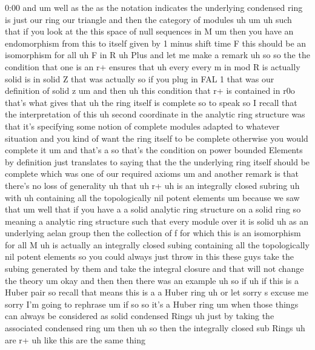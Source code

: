 \begin{unfinished}{0:00}
and  um  well  as  the  as  the  notation
indicates  the  underlying  condensed  ring
is  just  our  ring  our  triangle  and  then
the  category  of
modules
uh
um  uh  such  that  if  you  look  at  the  this
space  of  null  sequences  in  M  um  then  you
have  an  endomorphism  from  this  to  itself
given  by  1  minus  shift  time  F  this
should  be  an  isomorphism  for  all  uh  F  in
R  uh
Plus
and  let  me  make  a  remark  uh
so  so  the  the  condition  that  one  is  an
r+  ensures
that  uh  every  every  m  in  mod  R  is
actually  solid  is  in  solid
Z  that  was  actually  so  if  you  plug  in
FAL  1  that  was  our  definition  of  solid  z
um  and  then  uh  this  condition  that  r+  is
contained  in  r0o  that's  what  gives  that
uh  the  ring  itself  is  complete  so  to
speak  so  I  recall  that  the
interpretation  of  this  uh  second
coordinate  in  the  analytic  ring
structure  was  that  it's  specifying  some
notion  of  complete  modules  adapted  to
whatever  situation  and  you  kind  of  want
the  ring  itself  to  be  complete  otherwise
you  would  complete  it  um  and  that's  a  so
that's  the  condition  on  power  bounded
Elements  by  definition  just  translates
to  saying  that  the  the  underlying  ring
itself  should  be  complete  which  was  one
of  our  required
axioms  um  and  another  remark  is  that
there's  no  loss  of
generality
uh  that  uh
r+  uh  is  an  integrally  closed
subring
uh  with  uh  containing  all  the
topologically  nil  potent
elements
um  because  we  saw  that
um  well  that  if  you  have  a  a  solid
analytic  ring  structure  on  a  solid  ring
so  meaning  a  analytic  ring  structure
such  that  every  module  over  it  is  solid
uh  as  an  underlying  aelan  group  then  the
collection  of  f  for  which  this  is  an
isomorphism  for  all  M  uh  is  actually  an
integrally  closed  subing  containing  all
the  topologically  nil  potent  elements  so
you  could  always  just  throw  in  this
these  guys  take  the  subing  generated  by
them  and  take  the  integral  closure  and
that  will  not  change  the
theory
um
okay  and  then  then  there  was  an  example
uh  so  if
uh  if  this  is  a  Huber
pair  so  recall  that  means  this  is  a  a
Huber
ring  uh  or  let  sorry  s  excuse  me  sorry
I'm  going  to  rephrase  um
if
so  so  it's  a  Huber  ring  um  when  those
things  can  always  be  considered  as  solid
condensed  Rings  uh  just  by  taking  the
associated  condensed  ring  um
then  uh  so  then  the  integrally
closed  sub
Rings
uh  are
r+  uh  like  this  are  the  same  thing

\end{unfinished}
